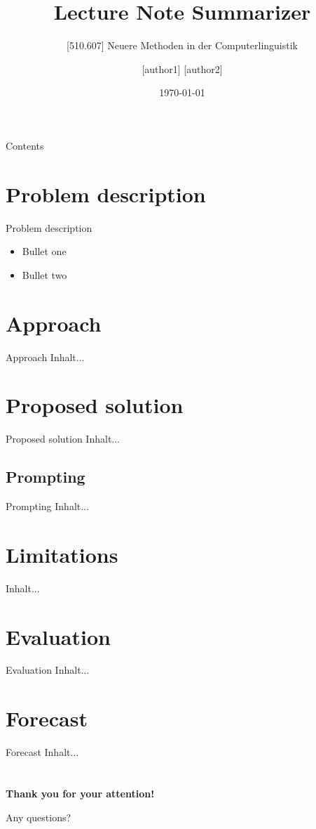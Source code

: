 \documentclass{beamer}
\title{Lecture Note Summarizer}
\subtitle{[510.607] Neuere Methoden in der Computerlinguistik}
\institute{Alpen-Adria-Universität Klagenfurt}
\author[auth1 auth2]{[author1] [author2]}
\date{\today}
\begin{document}
	\frame{\titlepage}
	\begin{frame}{Contents}
		\tableofcontents
	\end{frame}
	\section{Problem description}
	\begin{frame}{Problem description}
		\begin{itemize}
			\item Bullet one
			\item Bullet two
		\end{itemize}
	\end{frame}
	
	\section{Approach}
	\begin{frame}{Approach}
		Inhalt...
	\end{frame}
	
	\section{Proposed solution}
	\begin{frame}{Proposed solution}
		Inhalt...
	\end{frame}
	
	\subsection{Prompting}
	\begin{frame}{Prompting}
		Inhalt...
	\end{frame}
	
	\section{Limitations}
	\begin{frame}{}
		Inhalt...
	\end{frame}
	
	\section{Evaluation}
	\begin{frame}{Evaluation}
		Inhalt...
	\end{frame}
	
	\section{Forecast}
	\begin{frame}{Forecast}
		Inhalt...
	\end{frame}
  	
  	\section*{}
  	\begin{frame}{}
  		\centering
  		\vfill
  		{\Huge\textbf{Thank you for your attention!}\par}
  		\vspace{1.5cm}
  		{\large Any questions?}\par
  		\vfill
  	\end{frame}
\end{document}
